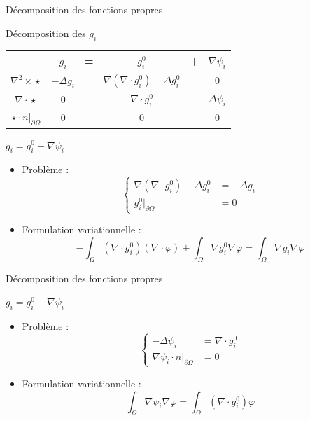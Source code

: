 \documentclass{beamer}
\newcommand{\grad}{{\nabla}}
\newcommand{\laplace}{{\Delta}}
\newcommand{\rott}{{\nabla^2\times}}
\newcommand{\diverg}{{\nabla\cdot}}
\newcommand{\restr}{{\big\rvert_{\partial\Omega}}}
\begin{document}
\begin{frame}{Décomposition des fonctions propres}
\begin{block}{Décomposition des $g_i$}
\begin{center}
\begin{tabular}{c|ccccc}
& $g_i$ & = & $g_i^0$ & + & $\grad\psi_i$ \\ \hline
$\rott\star$ & $-\laplace g_i$ & & $\grad(\diverg g_i^0)-\laplace g_i^0$ & & 0\\ \hline
$\diverg\star$ & 0 & & $\diverg g_i^0$ & & $\laplace\psi_i$\\ \hline
$\star\cdot n\restr$ & 0 & & 0 & & 0
\end{tabular}
\end{center}
\end{block}
\begin{block}{$g_i=g_i^0+\grad\psi_i$}
\begin{itemize}
\item Problème :
\[
\left\{
\begin{aligned}
\grad(\diverg g_i^0)-\laplace g_i^0 &= -\laplace g_i\\
g_i^0\restr &= 0
\end{aligned}
\right.
\]
\item Formulation variationnelle :
\[
-\int_\Omega (\diverg g_i^0)(\diverg\varphi) + \int_\Omega \grad g_i^0\grad\varphi = \int_\Omega \grad g_i\grad\varphi
\]
\end{itemize}
\end{block}
\end{frame}

\begin{frame}{Décomposition des fonctions propres}
\begin{block}{$g_i=g_i^0+\grad\psi_i$}
\begin{itemize}
\item Problème :
\[
\left\{
\begin{aligned}
-\laplace\psi_i &= \diverg g_i^0\\
\grad\psi_i\cdot n\restr &= 0
\end{aligned}
\right.
\]
\item Formulation variationnelle :
\[
\int_\Omega \grad\psi_i\grad\varphi = \int_\Omega (\diverg g_i^0)\varphi
\]
\end{itemize}
\end{block}
\end{frame}
\end{document}
